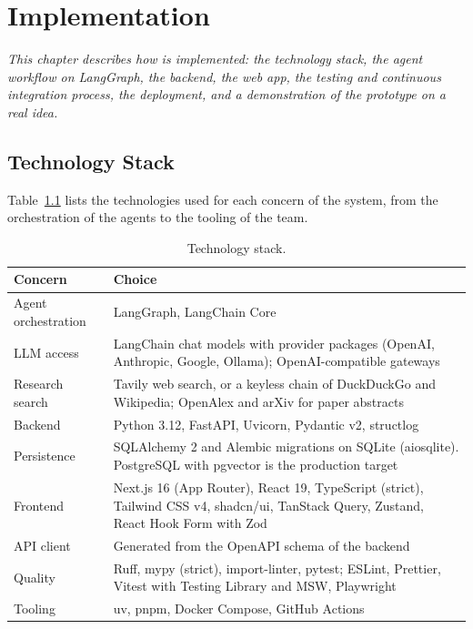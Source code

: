 \chapter{Implementation}
\label{chap:implementation}
\textit{This chapter describes how \sysname{} is implemented: the technology stack, the agent workflow on LangGraph, the backend, the web app, the testing and continuous integration process, the deployment, and a demonstration of the prototype on a real idea.}

\section{Technology Stack}
\label{sec:impl-stack}

Table~\ref{tab:impl-stack} lists the technologies used for each concern of the system, from the orchestration of the agents to the tooling of the team.

\begin{table}[H]
    \centering
    \caption{Technology stack.}
    \label{tab:impl-stack}
    \begin{tabularx}{\linewidth}{|l|X|}
        \hline
        \textbf{Concern} & \textbf{Choice} \\
        \hline
        Agent orchestration & LangGraph, LangChain Core \\
        LLM access & LangChain chat models with provider packages (OpenAI, Anthropic, Google, Ollama); OpenAI-compatible gateways \\
        Research search & Tavily web search, or a keyless chain of DuckDuckGo and Wikipedia; OpenAlex and arXiv for paper abstracts \\
        Backend & Python 3.12, FastAPI, Uvicorn, Pydantic v2, structlog \\
        Persistence & SQLAlchemy 2 and Alembic migrations on SQLite (aiosqlite). PostgreSQL with pgvector is the production target \\
        Frontend & Next.js 16 (App Router), React 19, TypeScript (strict), Tailwind CSS v4, shadcn/ui, TanStack Query, Zustand, React Hook Form with Zod \\
        API client & Generated from the OpenAPI schema of the backend \\
        Quality & Ruff, mypy (strict), import-linter, pytest; ESLint, Prettier, Vitest with Testing Library and MSW, Playwright \\
        Tooling & uv, pnpm, Docker Compose, GitHub Actions \\
        \hline
    \end{tabularx}
\end{table}

